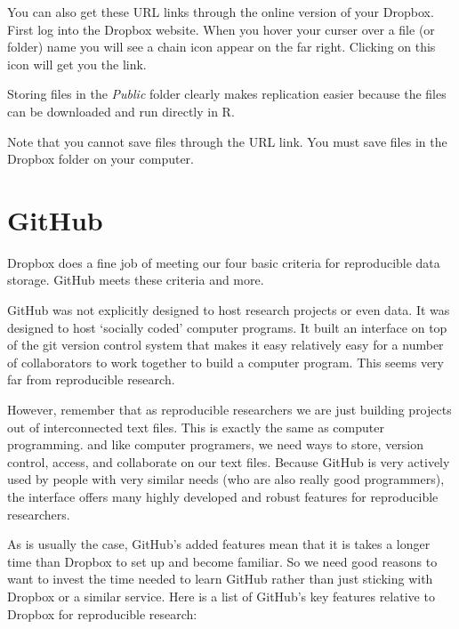 \documentclass[ChapterTOCs,krantz1]{krantz}\usepackage{graphicx, color}
\begin{document}
You can also get these URL links through the online version of your
Dropbox. First log into the Dropbox website. When you
hover your curser over a file (or folder) name you will see a chain icon
appear on the far right. Clicking on this icon will get you the link.

Storing files in the \emph{Public} folder clearly makes replication
easier because the files can be downloaded and run directly in
R.

Note that you cannot save files through the URL link. You must save
files in the Dropbox folder on your computer.

\section{GitHub}

Dropbox does a fine job of meeting our four basic criteria for
reproducible data storage. GitHub meets these criteria and
more.

GitHub was not explicitly designed to host research projects or
even data. It was designed to host `socially coded' computer programs.
It built an interface on top of the git version control system
that makes it easy relatively easy for a number of collaborators to work
together to build a computer program. This seems very far from
reproducible research.

However, remember that as reproducible researchers we are just building
projects out of interconnected text files. This is exactly the same as
computer programming. and like computer programers, we need ways to
store, version control, access, and collaborate on our text files.
Because GitHub is very actively used by people with very
similar needs (who are also really good programmers), the interface
offers many highly developed and robust features for reproducible
researchers.

As is usually the case, GitHub's added features mean that it is
takes a longer time than Dropbox to set up and become familiar.
So we need good reasons to want to invest the time needed to learn
GitHub rather than just sticking with Dropbox or a
similar service. Here is a list of GitHub's key features
relative to Dropbox for reproducible research:
\end{document}
